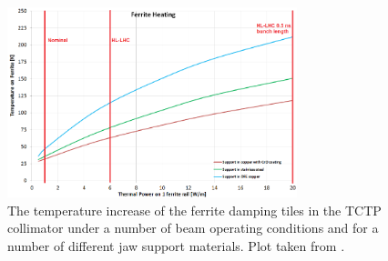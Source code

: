 \begin{figure}
\begin{center}
\includegraphics[width=0.75\textwidth]{LHC_Collimation_Upgrades/figures/temp_increase_tctp_col.png}
\end{center}
\caption{The temperature increase of the ferrite damping tiles in the TCTP collimator under a number of beam operating conditions and for a number of different jaw support materials. Plot taken from \cite{Carra:HeatLoad}.}
\label{fig:tctp-ferrite-temp-rise}
\end{figure}